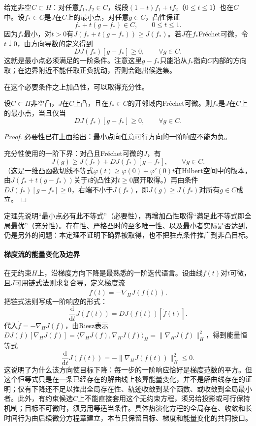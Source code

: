 给定非空$C\subset H$：对任意$f_1,f_2\in C$，线段$(1-t)f_1+tf_2$（$0\le t\le1$）也在$C$中。设$f_*\in C$是$J$在$C$上的最小点，对任意$g\in C$，凸性保证
\[
  f_*+t(g-f_*)\in C,\qquad 0\le t\le1.
\]
因为$f_*$最小，对$t>0$有$J(f_*+t(g-f_*))\ge J(f_*)$。若$J$在$f_*$Fréchet可微，令$t\downarrow0$，由方向导数的定义得到
\begin{equation}
  DJ(f_*)[g-f_*]\ge0,\qquad\forall g\in C.
  \label{eq:functional-convex-optimality}
\end{equation}
这就是最小点必须满足的一阶条件。注意这里$g-f_*$只能沿从$f_*$指向$C$内部的方向取；在边界附近不能任取正负扰动，否则会跑出候选集。

在这个必要条件之上加凸性，可以取得充分性。

\begin{theorem}[凸候选集上的一阶最优条件]\label{thm:functional-convex-optimality}
设$C\subset H$非空凸，$J$在$C$上凸，且在$f_*\in C$的开邻域内Fréchet可微。则$f_*$是$J$在$C$上的最小点，当且仅当
\[
  DJ(f_*)[g-f_*]\ge0,\qquad\forall g\in C.
\]
\end{theorem}

\begin{proof}
必要性已在上面给出：最小点向任意可行方向的一阶响应不能为负。

充分性使用的一阶下界：对凸且Fréchet可微的$J$，有
\[
  J(g)\ge J(f_*)+DJ(f_*)[g-f_*],\qquad\forall g\in C.
\]
（这是一维凸函数切线不等式$\varphi(t)\ge\varphi(0)+\varphi'(0)t$在Hilbert空间中的版本，由$J(f_*+t(g-f_*))$关于$t$的凸性对$t\ge0$展开取得。）再由条件$DJ(f_*)[g-f_*]\ge0$，右端不小于$J(f_*)$，即$J(g)\ge J(f_*)$对所有$g\in C$成立。
\end{proof}

定理先说明“最小点必有此不等式”（必要性），再增加凸性取得“满足此不等式即全局最优”（充分性）。存在性、严格凸时的至多唯一性、以及最小者实际是否达到，仍是另外的问题：本定理不证明下确界被取得，也不把驻点条件推广到非凸目标。

\paragraph{梯度流的能量变化及边界}

在无约束$H$上，沿梯度方向下降是最熟悉的一阶迭代语言。设曲线$f(t)$对$t$可微，且$J$可用链式法则求复合导，定义梯度流
\[
  \dot f(t)=-\nabla_HJ(f(t)).
\]
把链式法则写成一阶响应的形式：
\[
  \frac{\mathrm d}{\mathrm dt}J(f(t))
  =DJ(f(t))[\dot f(t)].
\]
代入$\dot f=-\nabla_HJ(f)$，由Riesz表示$DJ(f)[\nabla_HJ(f)]=\langle\nabla_HJ(f),\nabla_HJ(f)\rangle_H=\|\nabla_HJ(f)\|_H^2$，得到能量恒等式
\[
  \frac{\mathrm d}{\mathrm dt}J(f(t))
  =-\|\nabla_HJ(f(t))\|_H^2\le0.
\]
这说明了为什么该方向使目标下降：每一步的一阶响应恰好是梯度范数的平方。但这个恒等式只是在一条已经存在的解曲线上核算能量变化，并不是解曲线存在的证明；仅有下降还不足以推出全局存在性、轨迹收敛到某个函数、或收敛到全局最小者。此外，有约束候选$C$上不能直接套用这个无约束方程，须另给投影或可行保持机制；目标不可微时，须另用等适当条件。具体热演化方程的全局存在、收敛和长时间行为由后续微分方程章建立，本节只保留目标、梯度和能量变化的共同接口。

